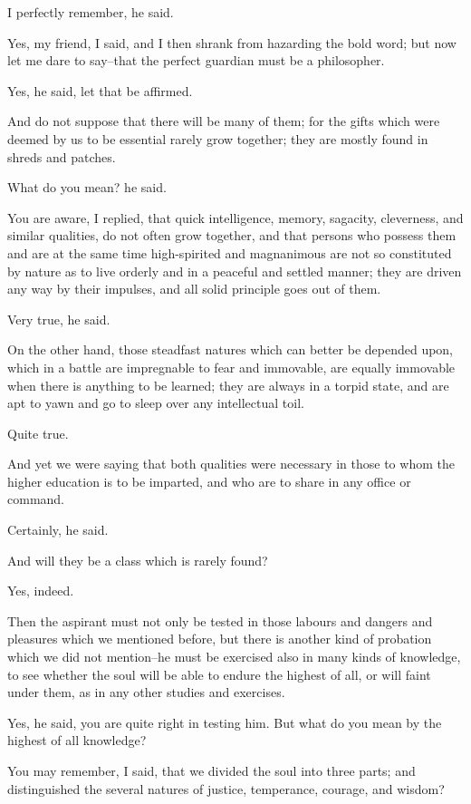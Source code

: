 I perfectly remember, he said.

Yes, my friend, I said, and I then shrank from hazarding the bold
word; but now let me dare to say--that the perfect guardian must be a
philosopher.

Yes, he said, let that be affirmed.

And do not suppose that there will be many of them; for the gifts which
were deemed by us to be essential rarely grow together; they are mostly
found in shreds and patches.

What do you mean? he said.

You are aware, I replied, that quick intelligence, memory, sagacity,
cleverness, and similar qualities, do not often grow together, and that
persons who possess them and are at the same time high-spirited and
magnanimous are not so constituted by nature as to live orderly and in a
peaceful and settled manner; they are driven any way by their impulses,
and all solid principle goes out of them.

Very true, he said.

On the other hand, those steadfast natures which can better be depended
upon, which in a battle are impregnable to fear and immovable, are
equally immovable when there is anything to be learned; they are
always in a torpid state, and are apt to yawn and go to sleep over any
intellectual toil.

Quite true.

And yet we were saying that both qualities were necessary in those to
whom the higher education is to be imparted, and who are to share in any
office or command.

Certainly, he said.

And will they be a class which is rarely found?

Yes, indeed.

Then the aspirant must not only be tested in those labours and dangers
and pleasures which we mentioned before, but there is another kind of
probation which we did not mention--he must be exercised also in many
kinds of knowledge, to see whether the soul will be able to endure the
highest of all, or will faint under them, as in any other studies and
exercises.

Yes, he said, you are quite right in testing him. But what do you mean
by the highest of all knowledge?

You may remember, I said, that we divided the soul into three parts; and
distinguished the several natures of justice, temperance, courage, and
wisdom?

